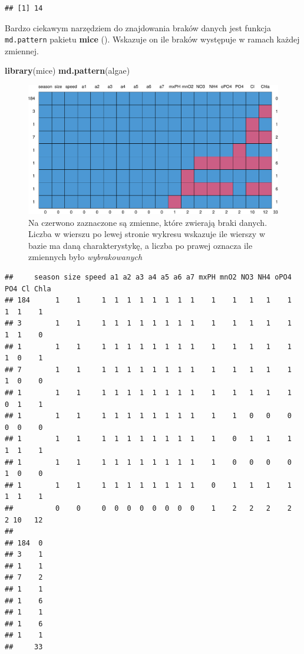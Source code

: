 \documentclass[
]{book}
\newenvironment{Shaded}{\begin{snugshade}}{\end{snugshade}}
\newcommand{\FunctionTok}[1]{\textcolor[rgb]{0.13,0.29,0.53}{\textbf{#1}}}
\newcommand{\NormalTok}[1]{#1}
\theoremstyle{plain}
\theoremstyle{definition}
\theoremstyle{definition}
\theoremstyle{definition}
\theoremstyle{definition}
\theoremstyle{definition}
\theoremstyle{remark}
\begin{document}
\begin{verbatim}
## [1] 14
\end{verbatim}

Bardzo ciekawym narzędziem do znajdowania braków danych jest funkcja \texttt{md.pattern} pakietu \textbf{mice} (). Wskazuje on ile braków występuje w ramach każdej zmiennej.

\begin{Shaded}
\begin{Highlighting}[]
\FunctionTok{library}\NormalTok{(mice)}
\FunctionTok{md.pattern}\NormalTok{(algae)}
\end{Highlighting}
\end{Shaded}

\begin{figure}
\centering
\includegraphics{EksploracjaDanych_files/figure-latex/mice1-1.pdf}
\caption{\label{fig:mice1}Na czerwono zaznaczone są zmienne, które zwierają braki danych. Liczba w wierszu po lewej stronie wykresu wskazuje ile wierszy w bazie ma daną charakterystykę, a liczba po prawej oznacza ile zmiennych było \emph{wybrakowanych}}
\end{figure}

\begin{verbatim}
##     season size speed a1 a2 a3 a4 a5 a6 a7 mxPH mnO2 NO3 NH4 oPO4 PO4 Cl Chla
## 184      1    1     1  1  1  1  1  1  1  1    1    1   1   1    1   1  1    1
## 3        1    1     1  1  1  1  1  1  1  1    1    1   1   1    1   1  1    0
## 1        1    1     1  1  1  1  1  1  1  1    1    1   1   1    1   1  0    1
## 7        1    1     1  1  1  1  1  1  1  1    1    1   1   1    1   1  0    0
## 1        1    1     1  1  1  1  1  1  1  1    1    1   1   1    1   0  1    1
## 1        1    1     1  1  1  1  1  1  1  1    1    1   0   0    0   0  0    0
## 1        1    1     1  1  1  1  1  1  1  1    1    0   1   1    1   1  1    1
## 1        1    1     1  1  1  1  1  1  1  1    1    0   0   0    0   1  0    0
## 1        1    1     1  1  1  1  1  1  1  1    0    1   1   1    1   1  1    1
##          0    0     0  0  0  0  0  0  0  0    1    2   2   2    2   2 10   12
##       
## 184  0
## 3    1
## 1    1
## 7    2
## 1    1
## 1    6
## 1    1
## 1    6
## 1    1
##     33
\end{verbatim}
\end{document}
